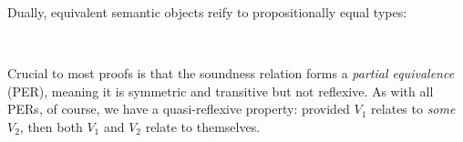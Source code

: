 \documentclass[sigplan,screen]{acmart}
\begin{document}
\Ni Dually, equivalent semantic objects reify to propositionally equal types: 

\begin{AgdaAlign}
\begin{code}%
%
\>[2]\AgdaSpace{}%
\AgdaSymbol{:}%
\>[3190I]\AgdaSymbol{\{}\AgdaSpace{}%
\AgdaSpace{}%
\AgdaSymbol{:}\AgdaSpace{}%
\AgdaSpace{}%
\AgdaSpace{}%
\AgdaSymbol{\}}\AgdaSpace{}%
\<%
\\
\>[.][@{}l@{}]\<[3190I]%
\>[12]\AgdaSpace{}%
\AgdaSpace{}%
\AgdaSpace{}%
\AgdaSpace{}%
\AgdaSpace{}%
\AgdaSpace{}%
\AgdaSpace{}%
\AgdaSpace{}%
\<%
\end{code}
\begin{code}[hide]%
%
\>[2]\AgdaSpace{}%
\AgdaSymbol{=}\AgdaSpace{}%
\<%
\end{code}
\end{AgdaAlign}

Crucial to most proofs is that the soundness relation forms a \emph{partial equivalence} (PER), meaning it is symmetric and transitive but not reflexive. As with all PERs, of course, we have a quasi-reflexive property: provided $V_1$ relates to \emph{some} $V_2$, then both $V_1$ and $V_2$ relate to themselves.

\begin{AgdaAlign}
\begin{code}[hide]%
%
\>[2]\AgdaSpace{}%
\AgdaModule{\AgdaUnderscore{}}\AgdaSpace{}%
\AgdaSymbol{\{}\AgdaSpace{}%
\AgdaSpace{}%
\AgdaSymbol{:}\AgdaSpace{}%
\AgdaSpace{}%
\AgdaSpace{}%
\AgdaSymbol{\}}\AgdaSpace{}%
\<%
\end{code}
\begin{code} %
\>[2][@{}l@{\AgdaIndent{1}}]%
\>[4]\AgdaSpace{}%
\AgdaSymbol{:}\AgdaSpace{}%
\AgdaSpace{}%
\AgdaSpace{}%
\AgdaSpace{}%
\AgdaSpace{}%
\AgdaSpace{}%
\AgdaSpace{}%
\<%
\\
%
\>[4]\AgdaSpace{}%
\AgdaSymbol{:}\AgdaSpace{}%
\AgdaSpace{}%
\AgdaSpace{}%
\AgdaSpace{}%
\AgdaSpace{}%
\AgdaSpace{}%
\AgdaSpace{}%
\<%
\end{code}
\begin{code}[hide]%
%
\>[4]\AgdaSpace{}%
\AgdaSymbol{=}\AgdaSpace{}%
\<%
\\
%
\>[4]\AgdaSpace{}%
\AgdaSymbol{=}\AgdaSpace{}%
\<%
\end{code}
\end{AgdaAlign}
\end{document}

